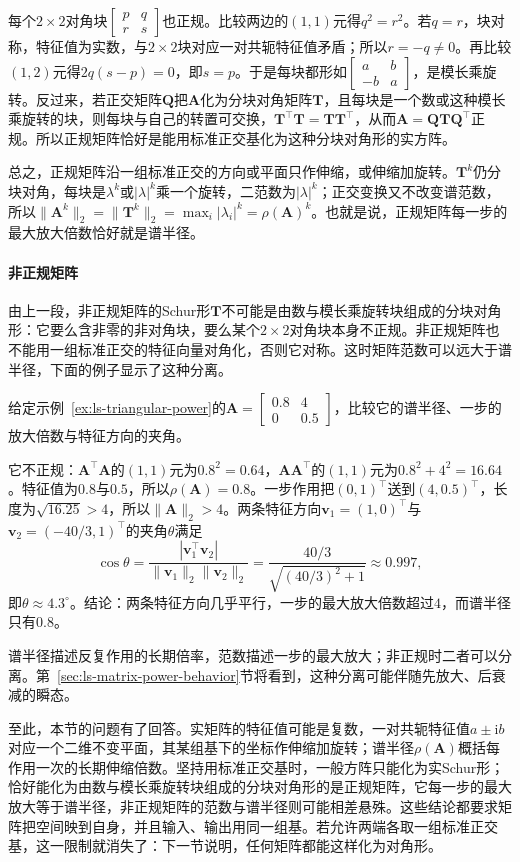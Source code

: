 每个$2\times2$对角块$\left[\begin{smallmatrix}p&q\\r&s\end{smallmatrix}\right]$也正规。比较两边的$(1,1)$元得$q^2=r^2$。若$q=r$，块对称，特征值为实数，与$2\times2$块对应一对共轭特征值矛盾；所以$r=-q\neq0$。再比较$(1,2)$元得$2q(s-p)=0$，即$s=p$。于是每块都形如$\left[\begin{smallmatrix}a&b\\-b&a\end{smallmatrix}\right]$，是模长乘旋转。反过来，若正交矩阵$\bm Q$把$\bm A$化为分块对角矩阵$\bm T$，且每块是一个数或这种模长乘旋转的块，则每块与自己的转置可交换，$\bm T^\top\bm T=\bm T\bm T^\top$，从而$\bm A=\bm Q\bm T\bm Q^\top$正规。所以正规矩阵恰好是能用标准正交基化为这种分块对角形的实方阵。

总之，正规矩阵沿一组标准正交的方向或平面只作伸缩，或伸缩加旋转。$\bm T^k$仍分块对角，每块是$\lambda^k$或$|\lambda|^k$乘一个旋转，二范数为$|\lambda|^k$；正交变换又不改变谱范数，所以$\lVert\bm A^k\rVert_2=\lVert\bm T^k\rVert_2=\max_i|\lambda_i|^k=\rho(\bm A)^k$。也就是说，正规矩阵每一步的最大放大倍数恰好就是谱半径。

\paragraph{非正规矩阵}
由上一段，非正规矩阵的Schur形$\bm T$不可能是由数与模长乘旋转块组成的分块对角形：它要么含非零的非对角块，要么某个$2\times2$对角块本身不正规。非正规矩阵也不能用一组标准正交的特征向量对角化，否则它对称。这时矩阵范数可以远大于谱半径，下面的例子显示了这种分离。
\begin{example}[非正规矩阵的范数与谱半径]
\label{ex:ls-nonnormal-norm-radius}
给定示例~\ref{ex:ls-triangular-power}的$\bm A=\left[\begin{smallmatrix}0.8&4\\0&0.5\end{smallmatrix}\right]$，比较它的谱半径、一步的放大倍数与特征方向的夹角。

它不正规：$\bm A^\top\bm A$的$(1,1)$元为$0.8^2=0.64$，$\bm A\bm A^\top$的$(1,1)$元为$0.8^2+4^2=16.64$。特征值为$0.8$与$0.5$，所以$\rho(\bm A)=0.8$。一步作用把$(0,1)^\top$送到$(4,0.5)^\top$，长度为$\sqrt{16.25}>4$，所以$\lVert\bm A\rVert_2>4$。两条特征方向$\bm v_1=(1,0)^\top$与$\bm v_2=(-40/3,1)^\top$的夹角$\theta$满足
\[
 \cos\theta=\frac{|\bm v_1^\top\bm v_2|}{\lVert\bm v_1\rVert_2\lVert\bm v_2\rVert_2}
 =\frac{40/3}{\sqrt{(40/3)^2+1}}\approx0.997,
\]
即$\theta\approx4.3^\circ$。结论：两条特征方向几乎平行，一步的最大放大倍数超过$4$，而谱半径只有$0.8$。
\end{example}
谱半径描述反复作用的长期倍率，范数描述一步的最大放大；非正规时二者可以分离。第~\ref{sec:ls-matrix-power-behavior}节将看到，这种分离可能伴随先放大、后衰减的瞬态。

至此，本节的问题有了回答。实矩阵的特征值可能是复数，一对共轭特征值$a\pm\mathrm ib$对应一个二维不变平面，其某组基下的坐标作伸缩加旋转；谱半径$\rho(\bm A)$概括每作用一次的长期伸缩倍数。坚持用标准正交基时，一般方阵只能化为实Schur形；恰好能化为由数与模长乘旋转块组成的分块对角形的是正规矩阵，它每一步的最大放大等于谱半径，非正规矩阵的范数与谱半径则可能相差悬殊。这些结论都要求矩阵把空间映到自身，并且输入、输出用同一组基。若允许两端各取一组标准正交基，这一限制就消失了：下一节说明，任何矩阵都能这样化为对角形。
